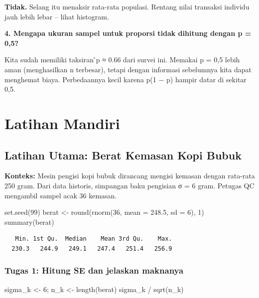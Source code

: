 \documentclass[
  indonesian,
  letterpaper,
]{book}
\newenvironment{Shaded}{\begin{snugshade}}{\end{snugshade}}
\newcommand{\AttributeTok}[1]{\textcolor[rgb]{0.40,0.45,0.13}{#1}}
\newcommand{\DecValTok}[1]{\textcolor[rgb]{0.68,0.00,0.00}{#1}}
\newcommand{\FloatTok}[1]{\textcolor[rgb]{0.68,0.00,0.00}{#1}}
\newcommand{\FunctionTok}[1]{\textcolor[rgb]{0.28,0.35,0.67}{#1}}
\newcommand{\NormalTok}[1]{\textcolor[rgb]{0.00,0.23,0.31}{#1}}
\newcommand{\OtherTok}[1]{\textcolor[rgb]{0.00,0.23,0.31}{#1}}
\newcommand{\SpecialCharTok}[1]{\textcolor[rgb]{0.37,0.37,0.37}{#1}}
\begin{document}
\textbf{Tidak.} Selang itu menaksir rata-rata populasi. Rentang nilai
transaksi individu jauh lebih lebar -- lihat histogram.

\textbf{4. Mengapa ukuran sampel untuk proporsi tidak dihitung dengan p
= 0,5?}

Kita sudah memiliki taksiran ̂p ≈ 0.66 dari survei ini. Memakai p = 0,5
lebih aman (menghasilkan n terbesar), tetapi dengan informasi sebelumnya
kita dapat menghemat biaya. Perbedaannya kecil karena p(1 − p) hampir
datar di sekitar 0,5.

\section{Latihan Mandiri}\label{latihan-mandiri}

\subsection{Latihan Utama: Berat Kemasan Kopi
Bubuk}\label{latihan-utama-berat-kemasan-kopi-bubuk}

\textbf{Konteks:} Mesin pengisi kopi bubuk dirancang mengisi kemasan
dengan rata-rata 250 gram. Dari data historis, simpangan baku pengisian
σ = 6 gram. Petugas QC mengambil sampel acak 36 kemasan.

\begin{Shaded}
\begin{Highlighting}[]
\FunctionTok{set.seed}\NormalTok{(}\DecValTok{99}\NormalTok{)}
\NormalTok{berat }\OtherTok{\textless{}{-}} \FunctionTok{round}\NormalTok{(}\FunctionTok{rnorm}\NormalTok{(}\DecValTok{36}\NormalTok{, }\AttributeTok{mean =} \FloatTok{248.5}\NormalTok{, }\AttributeTok{sd =} \DecValTok{6}\NormalTok{), }\DecValTok{1}\NormalTok{)}
\FunctionTok{summary}\NormalTok{(berat)}
\end{Highlighting}
\end{Shaded}

\begin{verbatim}
   Min. 1st Qu.  Median    Mean 3rd Qu.    Max. 
  230.3   244.9   249.1   247.4   251.4   256.9 
\end{verbatim}

\subsubsection{Tugas 1: Hitung SE dan jelaskan
maknanya}\label{tugas-1-hitung-se-dan-jelaskan-maknanya}

\begin{Shaded}
\begin{Highlighting}[]
\NormalTok{sigma\_k }\OtherTok{\textless{}{-}} \DecValTok{6}\NormalTok{; n\_k }\OtherTok{\textless{}{-}} \FunctionTok{length}\NormalTok{(berat)}
\NormalTok{sigma\_k }\SpecialCharTok{/} \FunctionTok{sqrt}\NormalTok{(n\_k)}
\end{Highlighting}
\end{Shaded}
\end{document}
